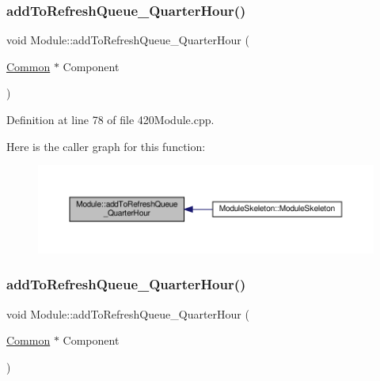 \mbox{\label{class_module_a25f5e60e0db8e157fee631928f745e82}} 
\subsubsection{\texorpdfstring{add\+To\+Refresh\+Queue\+\_\+\+Quarter\+Hour()}{addToRefreshQueue\_QuarterHour()}\hspace{0.1cm}{\footnotesize\ttfamily [1/2]}}
{\footnotesize\ttfamily void Module\+::add\+To\+Refresh\+Queue\+\_\+\+Quarter\+Hour (\begin{DoxyParamCaption}\item[{\hyperlink{class_common}{Common} $\ast$}]{Component }\end{DoxyParamCaption})}



Definition at line 78 of file 420\+Module.\+cpp.

Here is the caller graph for this function\+:
\nopagebreak
\begin{figure}[H]
\begin{center}
\leavevmode
\includegraphics[width=350pt]{class_module_a25f5e60e0db8e157fee631928f745e82_icgraph}
\end{center}
\end{figure}
\mbox{\label{class_module_a25f5e60e0db8e157fee631928f745e82}} 
\subsubsection{\texorpdfstring{add\+To\+Refresh\+Queue\+\_\+\+Quarter\+Hour()}{addToRefreshQueue\_QuarterHour()}\hspace{0.1cm}{\footnotesize\ttfamily [2/2]}}
{\footnotesize\ttfamily void Module\+::add\+To\+Refresh\+Queue\+\_\+\+Quarter\+Hour (\begin{DoxyParamCaption}\item[{\hyperlink{class_common}{Common} $\ast$}]{Component }\end{DoxyParamCaption})}

